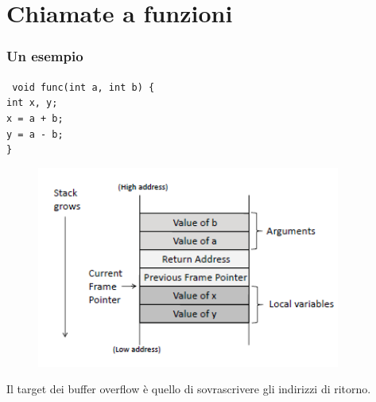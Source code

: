 \newpage
\section{Chiamate a funzioni}

\subsubsection{Un esempio}

\texttt{
    void func(int a, int b) \{ \\
     int x, y;\\
x = a + b;\\
y = a - b; \\ \}
}

\begin{figure}[ht]
    \centering
    \includegraphics[width=0.75\linewidth]{chapters/images5/func.png}
\end{figure}

Il target dei buffer overflow è quello di sovrascrivere gli indirizzi di ritorno.


